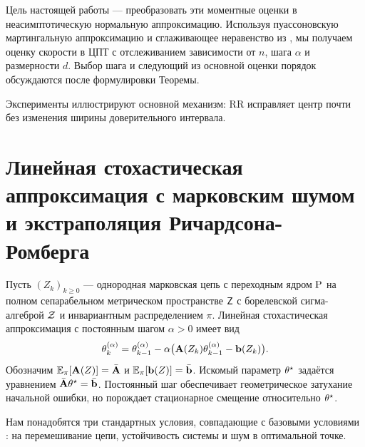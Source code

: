 \documentclass[blind]{psta}
\begin{document}
Цель настоящей работы --- преобразовать эти моментные оценки в
неасимптотическую нормальную аппроксимацию. Используя пуассоновскую
мартингальную аппроксимацию и сглаживающее неравенство из
\cite{Samsonov2025}, мы получаем оценку скорости в ЦПТ с отслеживанием
зависимости от $n$, шага $\alpha$ и размерности $d$. Выбор шага и следующий
из основной оценки порядок обсуждаются после формулировки Теоремы.

Эксперименты иллюстрируют основной механизм: RR исправляет центр почти без
изменения ширины доверительного интервала.

\section{Линейная стохастическая аппроксимация с марковским шумом и экстраполяция Ричардсона-Ромберга}\label{sec:model}

Пусть $(Z_k)_{k\geq 0}$ --- однородная марковская цепь с переходным ядром
$\mathrm{P}$ на полном сепарабельном метрическом пространстве $\mathsf{Z}$ с борелевской
сигма-алгеброй $\mathcal{Z}$ и инвариантным распределением $\pi$. Линейная
стохастическая аппроксимация с постоянным шагом $\alpha>0$ имеет вид
\begin{equation}\label{eq:lsa}
 \theta_k^{(\alpha)}=\theta_{k-1}^{(\alpha)}
 -\alpha\bigl(\mathbf{A}(Z_k)\theta_{k-1}^{(\alpha)}-\mathbf{b}(Z_k)\bigr).
\end{equation}
Обозначим $\mathbb{E}_\pi[\mathbf{A}(Z)]=\bar{\mathbf{A}}$ и
$\mathbb{E}_\pi[\mathbf{b}(Z)]=\bar{\mathbf{b}}$. Искомый параметр $\theta^\star$ задаётся
уравнением $\bar{\mathbf{A}}\theta^\star=\bar{\mathbf{b}}$. Постоянный шаг
обеспечивает геометрическое затухание начальной ошибки, но порождает
стационарное смещение относительно $\theta^\star$.

Нам понадобятся три стандартных условия, совпадающие с базовыми условиями
\cite{Levin2026}: на перемешивание цепи, устойчивость системы и шум в оптимальной точке.
\end{document}
